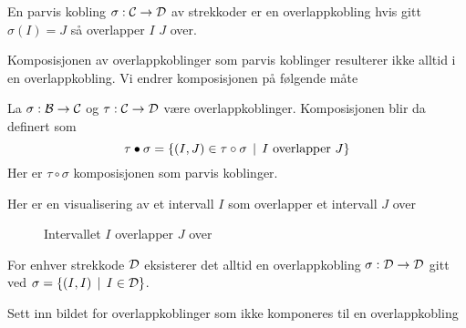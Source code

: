 \begin{definisjon}\label{def:OverlappMch}
  En parvis kobling $\sigma: \mathcal{C}\to \mathcal{D}$ av strekkoder
  er en overlappkobling hvis gitt $\sigma(I)=J$ så
  overlapper $I$ $J$ over.
\end{definisjon}

Komposisjonen av overlappkoblinger som parvis koblinger
resulterer ikke alltid i en overlappkobling. Vi endrer
komposisjonen på følgende måte

\begin{definisjon}\label{def:OK-Komp}
    La $\sigma: \mathcal{B}\to \mathcal{C}$ og $\tau:\mathcal{C}\to\mathcal{D}$
    være overlappkoblinger. Komposisjonen blir da
    definert som
    \[\tau\bullet\sigma
      = \left\{(I,J)\in\tau\circ\sigma\,\mid\,\text{$I$
    overlapper $J$}\right\}\]
    Her er $\tau\circ\sigma$ komposisjonen som parvis
    koblinger.
\end{definisjon}

Her er en visualisering av et intervall $I$ som overlapper
et intervall $J$ over
\begin{figure}[h]
  \centering
  
  \caption{Intervallet $I$ overlapper $J$ over}
  \label{fig:overkob}
\end{figure}


\begin{proposisjon}\label{prop:ID-OK}
For enhver strekkode $\mathcal{D}$ eksisterer det alltid en
overlappkobling $\sigma:\mathcal{D}\to\mathcal{D}$ gitt ved $\sigma
= \left\{(I,I)\,\mid\,I\in\mathcal{D}\right\}$.
\end{proposisjon}

Sett inn bildet for overlappkoblinger som ikke komponeres
til en overlappkobling

